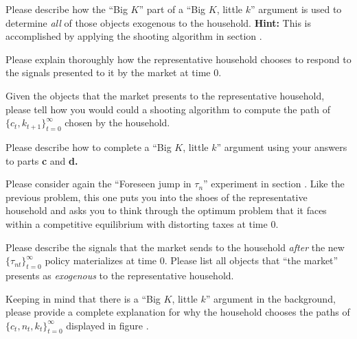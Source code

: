 \medskip
{}  Please describe how the ``Big $K$'' part of a ``Big $K$, little $k$'' argument is used to determine  {\it all\/}
of those objects exogenous to the household.  {\bf Hint:} This is accomplished by applying the shooting algorithm in section .
%

\medskip
{} Please explain thoroughly how the representative household chooses to respond to the signals presented to it
 by the market at time $0$. %

\medskip
{} Given the objects that the market presents to the representative household, please tell how you would could a shooting algorithm
to compute the path of $\{c_t, k_{t+1}\}_{t=0}^\infty$ chosen by the household.

\medskip
{}  Please describe how to complete a  ``Big $K$, little $k$'' argument using your answers to parts {\bf c} and {\bf d.}



\medskip
{}  \medskip
\medskip
\noindent Please consider again the  ``Foreseen jump in $\tau_n$''  experiment in section .  %
Like the previous problem, this one puts you  into the shoes of the representative household
and asks you to think through the optimum problem that it faces within a competitive equilibrium with distorting taxes at time
$0$.

\medskip

  Please describe the signals that the market sends to the household  {\it after\/}
the new $\{\tau_{nt}\}_{t=0}^\infty$ policy  materializes at time $0$. Please list  all  objects that ``the market''
presents as {\it exogenous\/} to the representative household.

\medskip
{}  Keeping in mind that there is a ``Big $K$, little $k$'' argument in the background,
please provide a complete explanation for why the household chooses the paths of $\{c_t, n_t, k_t\}_{t=0}^\infty$ displayed in
figure . %

